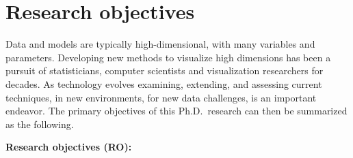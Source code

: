 \documentclass{monashthesis}
\begin{document}
\hypertarget{research-objectives}{%
\section{Research objectives}\label{research-objectives}}

Data and models are typically high-dimensional, with many variables and parameters. Developing new methods to visualize high dimensions has been a pursuit of statisticians, computer scientists and visualization researchers for decades. As technology evolves examining, extending, and assessing current techniques, in new environments, for new data challenges, is an important endeavor. The primary objectives of this Ph.D.~research can then be summarized as the following.

\textbf{Research objectives (RO):}
\end{document}
